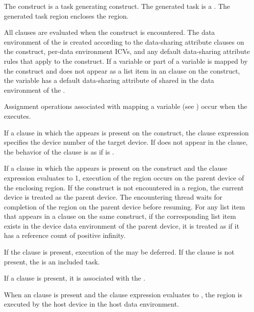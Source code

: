 The  construct is a task generating construct.  The generated task is 
a .  The generated task region encloses the  region.

All clauses are evaluated when the  construct is encountered.
The data environment of the  is created according to the
data-sharing attribute clauses on the  construct, per-data
environment ICVs, and any default data-sharing attribute rules that apply to
the  construct.  If a variable or part of a variable is mapped by
the  construct and does not appear as a list item in an
 clause on the construct, the variable has a default
data-sharing attribute of shared in the data environment of the .

Assignment operations associated with mapping a variable (see 
) occur when the  executes.

If a  clause in which the   
appears is present on the construct, the  clause expression specifies 
the device number of the target device. If  does not appear 
in the clause, the behavior of the clause is as if  is 
.

If a  clause in which the   
appears is present on the  construct and the  clause 
expression evaluates to 1, execution of the  region occurs on the 
parent device of the enclosing  region.  If the  
construct is not encountered in a  region, the current device is 
treated as the parent device.  The encountering thread waits for completion of the
 region on the parent device before resuming. For any list item
that appears in a  clause on the same construct, if the
corresponding list item exists in the device data environment of the parent
device, it is treated as if it has a reference count of positive infinity.

If the  clause is present, execution of the  may be 
deferred.  If the  clause is not present, the  is an 
included task.

If a  clause is present, it is associated with the .

When an  clause is present and the  clause expression evaluates 
to , the  region is executed by the host device in the host 
data environment.

